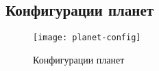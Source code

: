 \subsection{Конфигурации планет}

\begin{figure}[h!]
\centering
%
%
%  
%
%
%    
%    
%
%
%
%
%
%
%
%
\texttt{[image: planet-config]}
\caption{Конфигурации планет}
\end{figure}

